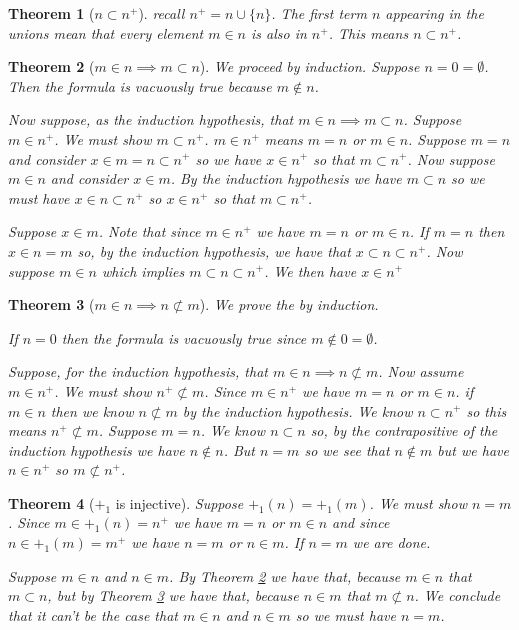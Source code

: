 \documentclass[12pt]{article}
\theoremstyle{break}
\theoremstyle{break}
\newtheorem{theorem}{Theorem}[section]
\theoremstyle{break}
\theoremstyle{break}
\theoremstyle{break}
\newtheorem{informal definition}[definition]{Informal Definition}
\begin{document}
\begin{theorem}[$n \subset n^+$]
recall $n^+= n \cup \{n\}$.
The first term $n$ appearing in the unions mean that every element $m\in n$ is also in $n^+$.
This means $n \subset n^+$.
\end{theorem}

\begin{theorem}[$m\in n \implies m \subset n$]
\label{thm:ntransitive}
We proceed by induction.
Suppose $n=0=\emptyset$.
Then the formula is vacuously true because $m\not \in n$.

Now suppose, as the induction hypothesis, that $m\in n \implies m \subset n$.
Suppose $m\in n^+$.
We must show $m\subset n^+$.
$m\in n^+$ means $m = n$ or $m\in n$.
Suppose $m=n$ and consider $x \in m=n \subset n^+$ so we have $x\in n^+$ so that $m\subset n^+$.
Now suppose $m\in n$ and consider $x\in m$.
By the induction hypothesis we have $m\subset n$ so we must have $x\in n \subset n^+$ so $x\in n^+$ so that $m\subset n^+$.


Suppose $x\in m$.
Note that since $m\in n^+$ we have $m=n$ or $m\in n$.
If $m=n$ then $x\in n=m$ so, by the induction hypothesis, we have that $x\subset n\subset n^+$.
Now suppose $m\in n$ which implies $m\subset n \subset n^+$.
We then have $x \in n^+$
\end{theorem}

\begin{theorem}[$m\in n \implies n \not \subset m$]
\label{thm:minnnnotsubsetm}
We prove the by induction.

If $n=0$ then the formula is vacuously true since $m\not \in 0 = \emptyset$.

Suppose, for the induction hypothesis, that $m\in n \implies n \not \subset m$.
Now assume $m\in n^+$.
We must show $n^+ \not \subset m$.
Since $m\in n^+$ we have $m=n$ or $m\in n$.
if $m\in n$ then we know $n\not \subset m$ by the induction hypothesis.
We know $n\subset n^+$ so this means $n^+ \not \subset m$.
Suppose $m=n$. We know $n\subset n$ so, by the contrapositive of the induction hypothesis we have $n\not \in n$.
But $n=m$ so we see that $n \not \in m$ but we have $n\in n^+$ so $m\not \subset n^+$.
\end{theorem}

\begin{theorem}[$+_1$ is injective]
\label{thm:+injective}
Suppose $+_1(n) = +_1(m)$.
We must show $n=m$.
Since $m\in +_1(n) = n^+$ we have $m=n$ or $m\in n$ and since $n\in  +_1(m) = m^+$ we have $n=m$ or $n\in m$.
If $n=m$ we are done.

Suppose $m\in n$ and $n\in m$.
By Theorem \ref{thm:ntransitive} we have that, because $m \in n$ that $m \subset n$, but by Theorem \ref{thm:minnnnotsubsetm} we have that, because $n\in m$ that $m\not \subset n$.
We conclude that it can't be the case that $m\in n$ and $n\in m$ so we must have $n=m$.

\end{theorem}
\end{document}
